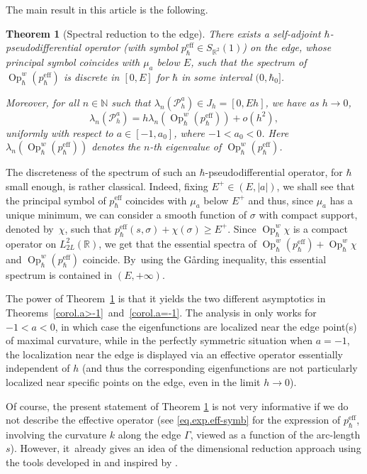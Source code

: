 \documentclass[10pt]{amsart}
\newcommand{\eff}{\mathrm{eff}}
\DeclareMathOperator{\Op}{Op}
\newcommand{\cP}{\mathcal{P}}
\theoremstyle{plain}
\newtheorem{theorem}{Theorem}[section]
\theoremstyle{definition}
\newcommand{\R}{\mathbb{R}}
\newcommand{\N}{\mathbb{N}}
\begin{document}
\pagebreak[2]
The main result in this article is the following.


\begin{theorem}[Spectral reduction to the edge]\label{thm.main}
There exists a self-adjoint $\hbar$\nobreakdash-pseudo\-differential operator (with symbol $p_\hbar^{\eff}\in S_{\R^2}(1)$) on the edge, whose principal symbol coincides with $\mu_a$ below $E$, such that the spectrum of $\Op^w_\hbar (p^{\eff}_\hbar)$ is discrete in $[0,E]$ for $\hbar$ in some interval $(0,\hbar_0]$.

Moreover, for all $n\in\N$ such that $\lambda_n(\cP_h^a)\in J_h=[0,Eh]$, we have as $h\to0$,
\[
\lambda_n(\cP^a_h)= h\lambda_n(\Op^w_\hbar (p^{\eff}_\hbar))+o(h^{2}),
\]
uniformly with respect to $a\in[-1,a_0]$, where $-1<a_0<0$. Here $\lambda_n(\Op^w_\hbar (p^{\eff}_\hbar))$ denotes the $n$-th eigenvalue of $\Op^w_\hbar (p^{\eff}_\hbar)$.
\end{theorem}

The discreteness of the spectrum of such an $\hbar$-pseudodifferential operator, for $\hbar$ small enough, is rather classical. Indeed, fixing $E^+\in(E,|a|)$, we shall see that the principal symbol of $p_\hbar^{\eff}$ coincides with $\mu_a$ below $E^+$ and thus, since $\mu_a$ has a unique minimum, we can consider a smooth function of $\sigma$ with compact support, denoted by~$\chi$, such that $p_\hbar^{\eff}(s,\sigma)+\chi(\sigma)\geq E^+$. Since $\Op^w_\hbar \chi$ is a compact operator on $L^2_{2L}(\R)$, we get that the essential spectra of $\Op^w_\hbar (p^{\eff}_\hbar)+\Op^w_\hbar \chi$ and $\Op^w_\hbar (p^{\eff}_\hbar)$ coincide. By~using the G\aa rding inequality, this essential spectrum is contained in $ (E,+\infty)$.

The power of Theorem~\ref{thm.main} is that it yields the two different asymptotics in Theorems~\ref{corol.a>-1}~and~\ref{corol.a=-1}. The analysis in \cite{AHK} only works for $-1<a<0$, in which case the eigenfunctions are localized near the edge point(s) of maximal curvature, while in the perfectly symmetric situation when $a=-1$, the localization near the edge is displayed via an effective operator essentially independent of $h$ (and thus the corresponding eigenfunctions are not particularly localized near specific points on the edge, even in the limit $h\to 0$).

Of course, the present statement of Theorem \ref{thm.main} is not very informative if we do not describe the effective operator (see \eqref{eq.exp.eff-symb} for the expression of $p_\hbar^{\eff}$, involving the curvature $k$ along the edge $\Gamma$, viewed as a function of the arc-length $s$). However, it~\hbox{already} gives an idea of the dimensional reduction approach using the tools developed in \cite{Keraval} and inspired by \cite{GMS91, M07}.
\end{document}
